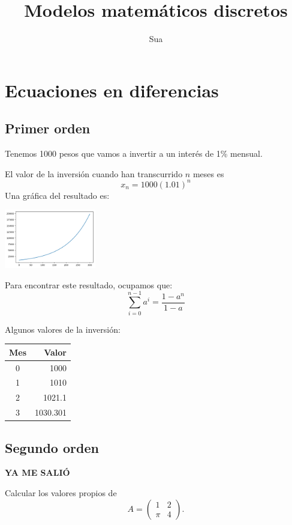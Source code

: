 \documentclass{article}
\title{Modelos matemáticos discretos}
\author{Sua}
\begin{document}
\maketitle
\section{Ecuaciones en diferencias}
\subsection{Primer orden}

Tenemos 1000 pesos que vamos a invertir a un interés de 1\% mensual.

El valor de la inversión cuando han transcurrido $n$ meses es $$x_n=1000(1.01)^n$$
Una gráfica del resultado es:

\begin{center}
\includegraphics[width=4cm]{grafica}
\end{center}

Para encontrar este resultado, ocupamos que: $$\sum_{i=0}^{n-1}a^i=\frac{1-a^n}{1-a}$$

Algunos valores de la inversión:
\begin{center}
\begin{tabular}{|c|r|}
\hline
Mes & Valor \\
\hline
0 & 1000 \\
1 & 1010 \\
2 & 1021.1 \\
3 & 1030.301 \\
\hline
\end{tabular}
\end{center}

\subsection{Segundo orden}


\begin{center}
\huge
\textbf{YA ME SALIÓ}
\end{center}

Calcular los valores propios de $$A=
\begin{pmatrix}
1 & 2 \\
\pi & 4
\end{pmatrix}.
$$
\end{document}
